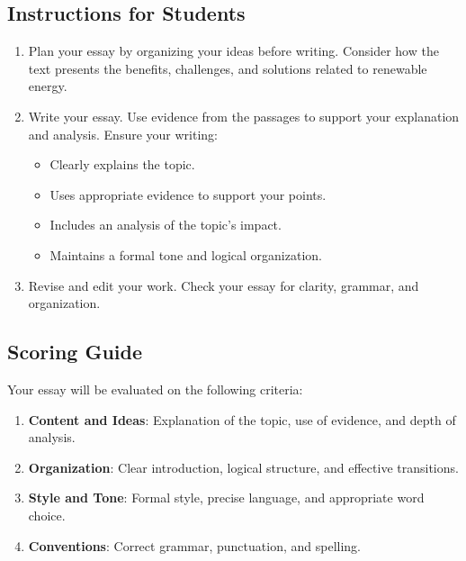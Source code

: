 \documentclass[12pt]{article}
\begin{document}
\subsection*{Instructions for Students}

\begin{enumerate}
    \item Plan your essay by organizing your ideas before writing. Consider how the text presents the benefits, challenges, and solutions related to renewable energy.
    \item Write your essay. Use evidence from the passages to support your explanation and analysis. Ensure your writing:
    \begin{itemize}
        \item Clearly explains the topic.
        \item Uses appropriate evidence to support your points.
        \item Includes an analysis of the topic's impact.
        \item Maintains a formal tone and logical organization.
    \end{itemize}
    \item Revise and edit your work. Check your essay for clarity, grammar, and organization.
\end{enumerate}

\subsection*{Scoring Guide}

Your essay will be evaluated on the following criteria:
\begin{enumerate}
    \item \textbf{Content and Ideas}: Explanation of the topic, use of evidence, and depth of analysis.
    \item \textbf{Organization}: Clear introduction, logical structure, and effective transitions.
    \item \textbf{Style and Tone}: Formal style, precise language, and appropriate word choice.
    \item \textbf{Conventions}: Correct grammar, punctuation, and spelling.
\end{enumerate}
\end{document}
